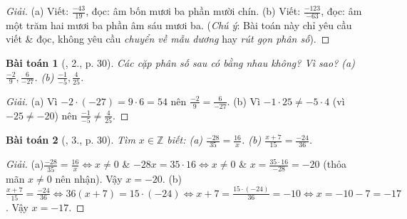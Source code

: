 \documentclass{article}
\newtheorem{baitoan}{Bài toán}
\begin{document}
\begin{proof}[Giải]
	(a) Viết: $\frac{-43}{19}$, đọc: âm bốn mươi ba phần mười chín. (b) Viết: $\frac{-123}{-63}$, đọc: âm một trăm hai mươi ba phần âm sáu mươi ba. (\textit{Chú ý}: Bài toán này chỉ yêu cầu viết \& đọc, không yêu cầu \textit{chuyển về mẫu dương} hay \textit{rút gọn phân số}).
\end{proof}

\begin{baitoan}[\cite{SGK_Toan_6_Canh_Dieu_tap_2}, 2., p. 30]
	Các cặp phân số sau có bằng nhau không? Vì sao? (a) $\frac{-2}{9},\frac{6}{-27}$.  (b) $\frac{-1}{-5},\frac{4}{25}$.
\end{baitoan}

\begin{proof}[Giải]
	(a) Vì $-2\cdot(-27) = 9\cdot6 = 54$ nên $\frac{-2}{9} = \frac{6}{-27}$. (b) Vì $-1\cdot25\ne-5\cdot4$ (vì $-25\ne-20$) nên $\frac{-1}{-5}\ne\frac{4}{25}$.
\end{proof}

\begin{baitoan}[\cite{SGK_Toan_6_Canh_Dieu_tap_2}, 3., p. 30]
	Tìm $x\in\mathbb{Z}$ biết: (a) $\frac{-28}{35} = \frac{16}{x}$. (b) $\frac{x + 7}{15} = \frac{-24}{36}$.
\end{baitoan}

\begin{proof}[Giải]
	(a)$\frac{-28}{35} = \frac{16}{x}\Leftrightarrow x\ne0$ \& $-28x = 35\cdot16\Leftrightarrow x\ne0$ \& $x = \frac{35\cdot16}{-28} = -20$ (thỏa mãn $x\ne0$ nên nhận). Vậy $x = -20$. (b) $\frac{x + 7}{15} = \frac{-24}{36}\Leftrightarrow36(x + 7) = 15\cdot(-24)\Leftrightarrow x + 7 = \frac{15\cdot(-24)}{36} = -10\Leftrightarrow x = -10 - 7 = -17$. Vậy $x = -17$.
\end{proof}
\end{document}
